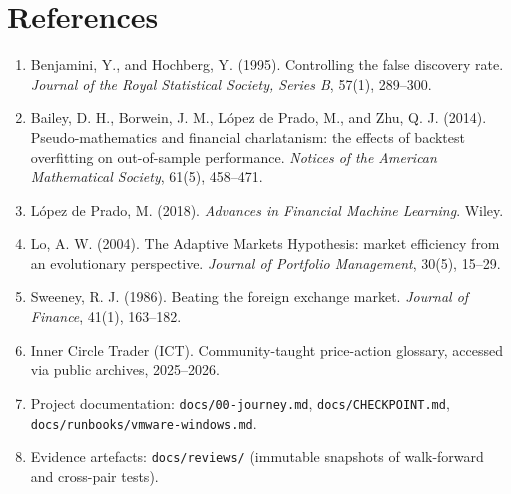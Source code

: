 \documentclass[11pt,a4paper]{article}
\begin{document}
\section*{References}

\begin{enumerate}
  \item Benjamini, Y., and Hochberg, Y. (1995). Controlling the false
        discovery rate. \emph{Journal of the Royal Statistical Society,
        Series B}, 57(1), 289--300.
  \item Bailey, D. H., Borwein, J. M., L\'opez de Prado, M., and Zhu, Q. J.
        (2014). Pseudo-mathematics and financial charlatanism: the
        effects of backtest overfitting on out-of-sample performance.
        \emph{Notices of the American Mathematical Society}, 61(5),
        458--471.
  \item L\'opez de Prado, M. (2018). \emph{Advances in Financial Machine
        Learning}. Wiley.
  \item Lo, A. W. (2004). The Adaptive Markets Hypothesis: market
        efficiency from an evolutionary perspective. \emph{Journal of
        Portfolio Management}, 30(5), 15--29.
  \item Sweeney, R. J. (1986). Beating the foreign exchange market.
        \emph{Journal of Finance}, 41(1), 163--182.
  \item Inner Circle Trader (ICT). Community-taught price-action
        glossary, accessed via public archives, 2025--2026.
  \item Project documentation: \texttt{docs/00-journey.md},
        \texttt{docs/CHECKPOINT.md}, \texttt{docs/runbooks/vmware-windows.md}.
  \item Evidence artefacts: \texttt{docs/reviews/} (immutable snapshots
        of walk-forward and cross-pair tests).
\end{enumerate}
\end{document}
